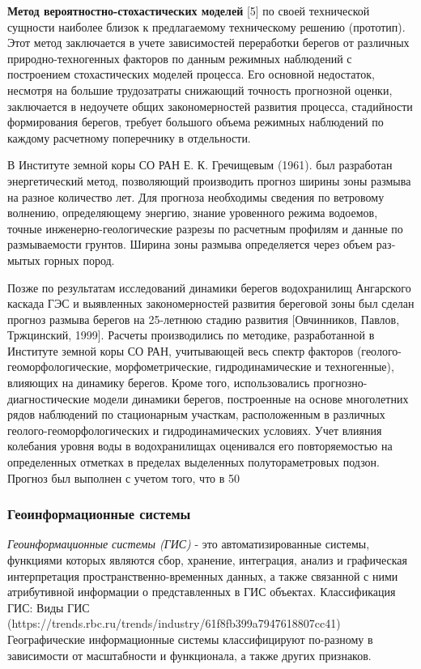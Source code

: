 \documentclass[732,14pt,final]{studrep}
\begin{document}
\textbf{Метод вероятностно-стохастических моделей} [5] по своей технической сущности наиболее близок к предлагаемому техническому решению (прототип). Этот метод заключается в учете зависимостей переработки берегов от различных природно-техногенных факторов по данным режимных наблюдений с построением стохастических моделей процесса. Его основной недостаток, несмотря на большие трудозатраты снижающий точность прогнозной оценки, заключается в недоучете общих закономерностей развития процесса, стадийности формирования берегов, требует большого объема режимных наблюдений по каждому расчетному поперечнику в отдельности.

В Институте земной коры СО РАН Е. К. Гречищевым (1961). был разработан энергетический метод, позволяющий производить прогноз ширины зоны размыва на разное количество лет. Для прогноза необходимы сведения по ветровому волнению, определяющему энергию, знание уровенного режима водоемов, точные инженерно-геологические разрезы по расчетным профи­лям и данные по размываемости грунтов. Ширина зоны размыва определяется через объем раз­мытых горных пород.

Позже по результатам исследований динамики берегов водохранилищ Ангарского каскада ГЭС и выявленных закономерностей развития береговой зоны был сделан прогноз размыва берегов на 25-летнюю стадию развития [Овчинников, Павлов, Тржцинский, 1999]. Расчеты производились по методике, разработанной в Институте земной коры СО РАН, учитывающей весь спектр факторов (геолого-геоморфологические, морфометрические, гидродинамические и техногенные), влияющих на динамику берегов. Кроме того, использовались прогнозно-диагностические модели динамики берегов, построенные на основе многолетних рядов наблюдений по стационарным участкам, расположенным в различных геолого-геоморфологических и гидродинамических условиях. Учет влияния колебания уровня воды в водохранилищах оценивался его повторяемостью на определенных отметках в пределах выделенных полутораметровых подзон. Прогноз был выполнен с учетом того, что в 50 %

\subsubsection{Геоинформационные системы}


\emph{Геоинформационные системы (ГИС)} - это автоматизированные системы, функциями которых являются сбор, хранение, интеграция, анализ и графическая интерпретация пространственно-временных данных, а также связанной с ними атрибутивной информации о представленных в ГИС объектах.
Классификация ГИС:
Виды ГИС (https://trends.rbc.ru/trends/industry/61f8fb399a7947618807cc41)
Географические информационные системы классифицируют по-разному в зависимости от масштабности и функционала, а также других признаков.
\end{document}
